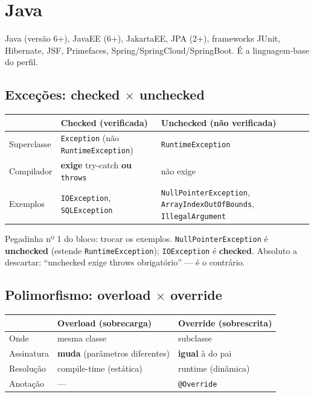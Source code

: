\chapter{Java}
\label{cap:java}

\begin{edital}
Java (versão 6+), JavaEE (6+), JakartaEE, JPA (2+), frameworks JUnit,
Hibernate, JSF, Primefaces, Spring/SpringCloud/SpringBoot. É a linguagem-base
do perfil.
\end{edital}

\section{Exceções: checked $\times$ unchecked}

\begin{center}
\begin{tabular}{@{}p{2.6cm}p{4.6cm}p{4.6cm}@{}}
\toprule
& \textbf{Checked (verificada)} & \textbf{Unchecked (não verificada)} \\
\midrule
Superclasse & \texttt{Exception} (não \texttt{RuntimeException}) & \texttt{RuntimeException} \\
Compilador & \textbf{exige} try-catch \textbf{ou} \texttt{throws} & não exige \\
Exemplos & \texttt{IOException}, \texttt{SQLException} & \texttt{NullPointerException}, \texttt{ArrayIndexOutOfBounds}, \texttt{IllegalArgument} \\
\bottomrule
\end{tabular}
\end{center}

\begin{pegadinha}
Pegadinha nº 1 do bloco: trocar os exemplos. \texttt{NullPointerException} é
\textbf{unchecked} (estende \texttt{RuntimeException}); \texttt{IOException}
é \textbf{checked}. Absoluto a descartar: ``unchecked exige throws
obrigatório'' --- é o contrário.
\end{pegadinha}

\section{Polimorfismo: overload $\times$ override}

\begin{center}
\begin{tabular}{@{}p{2.6cm}p{4.6cm}p{4.6cm}@{}}
\toprule
& \textbf{Overload (sobrecarga)} & \textbf{Override (sobrescrita)} \\
\midrule
Onde & mesma classe & subclasse \\
Assinatura & \textbf{muda} (parâmetros diferentes) & \textbf{igual} à do pai \\
Resolução & compile-time (estática) & runtime (dinâmica) \\
Anotação & --- & \texttt{@Override} \\
\bottomrule
\end{tabular}
\end{center}

